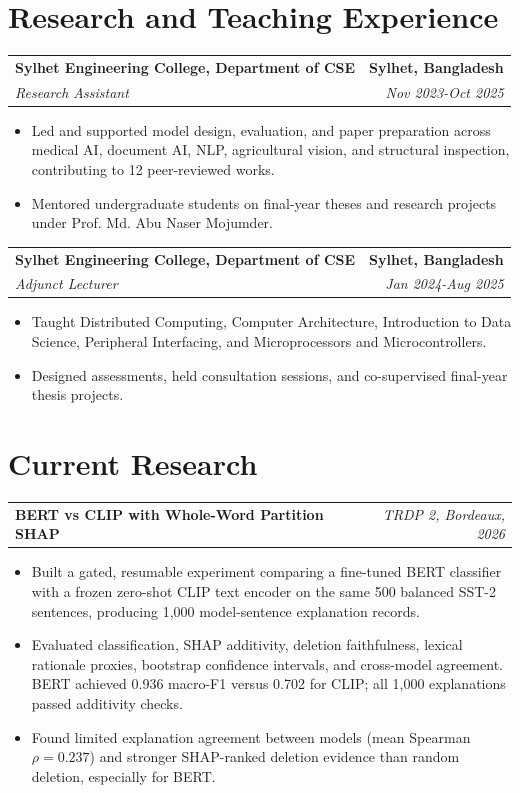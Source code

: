 \documentclass[10pt,a4paper]{article}
\makeatletter
\newcommand{\entry}[4]{%
  \begin{tabularx}{\textwidth}{@{}X r@{}}
    \textbf{#1} & \textbf{#2} \\
    \textit{#3} & \textit{#4}
  \end{tabularx}\vspace{-2pt}
}
\newcommand{\project}[2]{%
  \begin{tabularx}{\textwidth}{@{}X r@{}}
    \textbf{#1} & \textit{#2}
  \end{tabularx}\vspace{-2pt}
}
\makeatother
\begin{document}
\section{Research and Teaching Experience}
\entry{Sylhet Engineering College, Department of CSE}{Sylhet, Bangladesh}{Research Assistant}{Nov 2023-Oct 2025}
\begin{itemize}
  \item Led and supported model design, evaluation, and paper preparation across medical AI, document AI, NLP, agricultural vision, and structural inspection, contributing to 12 peer-reviewed works.
  \item Mentored undergraduate students on final-year theses and research projects under Prof. Md. Abu Naser Mojumder.
\end{itemize}
\entry{Sylhet Engineering College, Department of CSE}{Sylhet, Bangladesh}{Adjunct Lecturer}{Jan 2024-Aug 2025}
\begin{itemize}
  \item Taught Distributed Computing, Computer Architecture, Introduction to Data Science, Peripheral Interfacing, and Microprocessors and Microcontrollers.
  \item Designed assessments, held consultation sessions, and co-supervised final-year thesis projects.
\end{itemize}

\section{Current Research}
\project{BERT vs CLIP with Whole-Word Partition SHAP}{TRDP 2, Bordeaux, 2026}
\begin{itemize}
  \item Built a gated, resumable experiment comparing a fine-tuned BERT classifier with a frozen zero-shot CLIP text encoder on the same 500 balanced SST-2 sentences, producing 1,000 model-sentence explanation records.
  \item Evaluated classification, SHAP additivity, deletion faithfulness, lexical rationale proxies, bootstrap confidence intervals, and cross-model agreement. BERT achieved 0.936 macro-F1 versus 0.702 for CLIP; all 1,000 explanations passed additivity checks.
  \item Found limited explanation agreement between models (mean Spearman $\rho=0.237$) and stronger SHAP-ranked deletion evidence than random deletion, especially for BERT.
\end{itemize}
\end{document}
